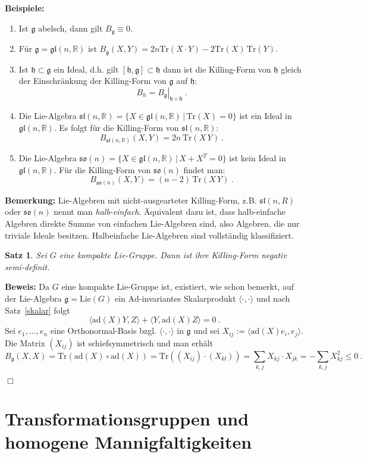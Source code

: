 \documentclass[12pt,a4paper]{article}
\def\R{\mathbb{R}}
\def\so{\mathfrak{so}}
\def\sl{\mathfrak{sl}}
\def\Ad{\mathrm{Ad}}
\def\ad{\mathrm{ad}}
\def\Lie{\mathrm{Lie}}
\def\Tr{\mathrm{Tr}}
\def\g{\mathfrak{g}}
\def\h{\mathfrak{h}}
\def\la{\langle}
\def\ra{\rangle}
\def\gl{\mathfrak{gl}}
\def\ad{\mathrm{ad}}
\newtheorem{Satz}[Lemma]{Satz}
\def\proof{\noindent\textbf{Beweis:}\quad}
\def\qed{\quad\hfill\ensuremath{\Box}}
\begin{document}
\bigskip

{\bf Beispiele:}
\begin{enumerate}
\item
Ist $\g$ abelsch, dann gilt $B_\g \equiv 0$.
\item
F\"ur $\g = \gl(n,\R)$ ist $B_\g(X,Y) = 2n \Tr(X\cdot Y) - 2\Tr(X) \, \Tr(Y)$.
\item
Ist $\h \subset \g$ ein Ideal, d.h. gilt $[\h,\g]\subset \h$ dann ist die Killing-Form von
$\h$ gleich der Einschr\"ankung der Killing-Form von $\g$ auf $\h$:
$$
B_h = \left.B_\g\right|_{\h \times \h} \ .
$$
\item
Die Lie-Algebra $\sl(n,\R) = \{ X \in \gl(n,\R) \, | \, \Tr(X)=0 \}$ ist ein Ideal in $\gl(n,\R)$.
Es folgt f\"ur die Killing-Form von $\sl(n,\R)$:
$$
B_{\sl(n,\R)}(X,Y) = 2n \, \Tr (X\, Y) \ .
$$
\item
Die Lie-Algebra $\so(n) = \{ X \in \gl(n,\R) \, |\, X + X^T = 0\}$ ist kein Ideal in $\gl(n,\R)$.
F\"ur die Killing-Form von $\so(n)$ findet man:
$$
B_{\so(n)} (X, Y) = (n-2)\, \Tr(X\,Y ) \ .
$$
\end{enumerate}


\bigskip

{\bf Bemerkung:} Lie-Algebren mit nicht-ausgearteter Killing-Form, z.B. $\sl(n,R)$ oder $\so(n)$
nennt man {\it halb-einfach}. \"Aquivalent dazu ist, dass halb-einfache Algebren direkte Summe
von einfachen Lie-Algebren sind, also Algebren, die nur triviale Ideale besitzen. Halbeinfache
Lie-Algebren sind vollst\"andig klassifiziert.

\bigskip

\begin{Satz}
Sei $G$ eine kompakte Lie-Gruppe. Dann ist ihre Killing-Form negativ semi-definit.
\end{Satz}
\proof
Da $G$ eine kompakte Lie-Gruppe ist, existiert, wie schon bemerkt, auf der Lie-Algebra
$\g = \Lie(G)$ ein $\Ad$-invariantes Skalarprodukt $\la \cdot, \cdot\ra$ und nach
Satz~\ref{skalar} folgt
$$
\la \ad (X)Y, Z \ra +  \la Y, \ad (X)Z \ra = 0 \ .
$$
Sei $e_1, \ldots, e_n$ eine Orthonormal-Basis bzgl. $\la \cdot, \cdot \ra$
in $\g$ und sei $X_{ij}:= \la \ad(X)e_i, e_j \ra$. Die Matrix $(X_{ij})$
ist schiefsymmetrisch und man erh\"alt
$$
B_\g(X,X) = \Tr(\ad(X) \circ \ad(X)) = \Tr((X_{ij})\cdot (X_{kl}))
= \sum_{k,j} X_{kj}\cdot X_{jk} = - \sum_{k,j} X_{kj}^2 \le 0 \ .
$$

\qed

\section{Transformationsgruppen und homogene Mannigfaltigkeiten}
\end{document}
